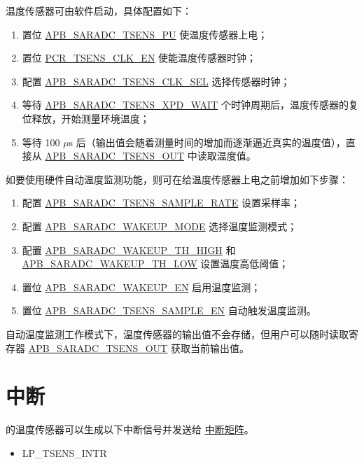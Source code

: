 \documentclass[main\_\_CN.tex]{subfiles}
\begin{document}
温度传感器可由软件启动，具体配置如下：
    \begin{enumerate}
        \item 置位 \hyperref[fielddesc:APBSARADCTSENSPU]{APB\_SARADC\_TSENS\_PU} 使温度传感器上电；
        \item 置位 \hyperref[fielddesc:PCRTSENSCLKEN]{PCR\_TSENS\_CLK\_EN} 使能温度传感器时钟；
        \item 配置 \hyperref[fielddesc:APBSARADCTSENSCLKSEL]{APB\_SARADC\_TSENS\_CLK\_SEL} 选择传感器时钟；
        \item 等待 \hyperref[fielddesc:APBSARADCTSENSXPDWAIT]{APB\_SARADC\_TSENS\_XPD\_WAIT} 个时钟周期后，温度传感器的复位释放，开始测量环境温度；
        \item 等待 100 $\mu$s 后（输出值会随着测量时间的增加而逐渐逼近真实的温度值），直接从 \hyperref[fielddesc:APBSARADCTSENSOUT]{APB\_SARADC\_TSENS\_OUT} 中读取温度值。
    \end{enumerate}
如要使用硬件自动温度监测功能，则可在给温度传感器上电之前增加如下步骤：
    \begin{enumerate}
        \item 配置 \hyperref[fielddesc:APBSARADCTSENSSAMPLERATE]{APB\_SARADC\_TSENS\_SAMPLE\_RATE} 设置采样率；
        \item 配置 \hyperref[fielddesc:APBSARADCWAKEUPMODE]{APB\_SARADC\_WAKEUP\_MODE} 选择温度监测模式；
        \item 配置 \hyperref[fielddesc:APBSARADCWAKEUPTHHIGH]{APB\_SARADC\_WAKEUP\_TH\_HIGH} 和 \hyperref[fielddesc:APBSARADCWAKEUPTHLOW]{APB\_SARADC\_WAKEUP\_TH\_LOW} 设置温度高低阈值；
        \item 置位 \hyperref[fielddesc:APBSARADCWAKEUPEN]{APB\_SARADC\_WAKEUP\_EN} 启用温度监测；
        \item 置位 \hyperref[fielddesc:APBSARADCTSENSSAMPLEEN]{APB\_SARADC\_TSENS\_SAMPLE\_EN} 自动触发温度监测。
    \end{enumerate}

自动温度监测工作模式下，温度传感器的输出值不会存储，但用户可以随时读取寄存器 \hyperref[fielddesc:APBSARADCTSENSOUT]{APB\_SARADC\_TSENS\_OUT} 获取当前输出值。

\section{中断}

\chipname{} 的温度传感器可以生成以下中断信号并发送给 \hyperref[mod:intmtrx]{中断矩阵}。

    \begin{itemize}
        \item LP\_TSENS\_INTR
    \end{itemize}
\end{document}
